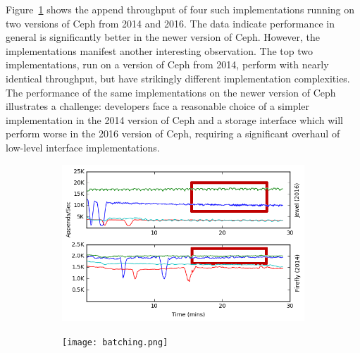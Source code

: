 Figure~\ref{fig:phy-design} shows the append throughput of four such
implementations running on two versions of Ceph from 2014 and 2016. The data indicate 
performance in general is significantly better in the newer version of Ceph. 
However, the implementations manifest another interesting observation. The top two
implementations, run on a version of Ceph from 2014, perform with nearly identical throughput, 
but have strikingly different implementation complexities. The performance of the same
implementations on the newer version of Ceph illustrates a challenge: developers face a
reasonable choice of a simpler implementation in the 2014 version of Ceph and a storage interface
which will perform worse in the 2016 version of Ceph, requiring a significant overhaul of low-level
interface implementations.

\begin{figure}[t]
    \centering
    \begin{subfigure}[b]{.3\linewidth}
        \centering
        \includegraphics[width=1.0\linewidth]{jewel_v_firefly_pd.png}
        \caption{}
        \label{fig:phy-design}
    \end{subfigure}
    \begin{subfigure}[b]{.3\linewidth}
        \centering
        \texttt{[image: batching.png]}
        \caption{}
        \label{fig:batching}
    \end{subfigure}
    \begin{subfigure}[b]{.3\linewidth}
        \centering

\end{subfigure}
\end{figure}
